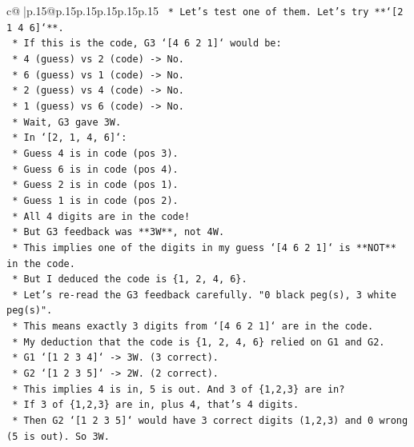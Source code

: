 \documentclass{article}
\begin{document}
{\begin{supertabular}{c@{$\;$}|p{.15\linewidth}@{}p{.15\linewidth}p{.15\linewidth}p{.15\linewidth}p{.15\linewidth}p{.15\linewidth}}
{{{\texttt{    *   Let's test one of them. Let's try **`{[}2 1 4 6{]}`**.} \\
\texttt{        *   If this is the code, G3 `{[}4 6 2 1{]}` would be:} \\
\texttt{            *   4 (guess) vs 2 (code) {-}> No.} \\
\texttt{            *   6 (guess) vs 1 (code) {-}> No.} \\
\texttt{            *   2 (guess) vs 4 (code) {-}> No.} \\
\texttt{            *   1 (guess) vs 6 (code) {-}> No.} \\
\texttt{            *   Wait, G3 gave 3W.} \\
\texttt{            *   In `{[}2, 1, 4, 6{]}`:} \\
\texttt{                *   Guess 4 is in code (pos 3).} \\
\texttt{                *   Guess 6 is in code (pos 4).} \\
\texttt{                *   Guess 2 is in code (pos 1).} \\
\texttt{                *   Guess 1 is in code (pos 2).} \\
\texttt{                *   All 4 digits are in the code!} \\
\texttt{                *   But G3 feedback was **3W**, not 4W.} \\
\texttt{                *   This implies one of the digits in my guess `{[}4 6 2 1{]}` is **NOT** in the code.} \\
\texttt{                *   But I deduced the code is \{1, 2, 4, 6\}.} \\
\texttt{                *   Let's re{-}read the G3 feedback carefully. "0 black peg(s), 3 white peg(s)".} \\
\texttt{                *   This means exactly 3 digits from `{[}4 6 2 1{]}` are in the code.} \\
\texttt{                *   My deduction that the code is \{1, 2, 4, 6\} relied on G1 and G2.} \\
\texttt{                *   G1 `{[}1 2 3 4{]}` {-}> 3W. (3 correct).} \\
\texttt{                *   G2 `{[}1 2 3 5{]}` {-}> 2W. (2 correct).} \\
\texttt{                *   This implies 4 is in, 5 is out. And 3 of \{1,2,3\} are in?} \\
\texttt{                    *   If 3 of \{1,2,3\} are in, plus 4, that's 4 digits.} \\
\texttt{                    *   Then G2 `{[}1 2 3 5{]}` would have 3 correct digits (1,2,3) and 0 wrong (5 is out). So 3W.} \\
}}}
\end{supertabular}}
\end{document}
